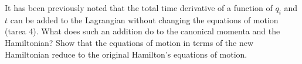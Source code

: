 \documentclass[../main.tex]{subfiles}
\begin{document}
\begin{problema}
	It has been previously noted that the total time derivative of a function
	of \(q_{i}\) and \(t\) can be added to the Lagrangian without changing the
	equations of motion (tarea 4). What does such an addition do to the canonical
	momenta and the Hamiltonian? Show that the equations of motion in terms of
	the new Hamiltonian reduce to the original Hamilton's equations of motion.
\end{problema}
\end{document}
